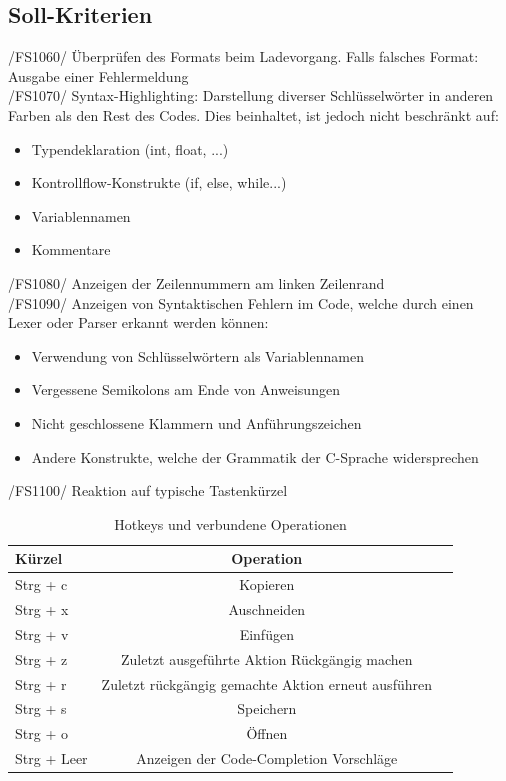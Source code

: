 \documentclass[a4paper]{scrreprt}
\begin{document}
\subsection{Soll-Kriterien}
/FS1060/ Überprüfen des Formats beim Ladevorgang. Falls falsches Format: Ausgabe einer Fehlermeldung \\
/FS1070/ Syntax-Highlighting: Darstellung diverser Schlüsselwörter in anderen Farben als den Rest des Codes. Dies beinhaltet, ist jedoch nicht beschränkt auf: 
\begin{itemize}
\item Typendeklaration (int, float, ...)
\item Kontrollflow-Konstrukte (if, else, while...)
\item Variablennamen
\item Kommentare
\end{itemize}
/FS1080/ Anzeigen der Zeilennummern am linken Zeilenrand \\
/FS1090/ Anzeigen von Syntaktischen Fehlern im Code, welche durch einen Lexer oder Parser erkannt werden können: 
\begin{itemize}
\item Verwendung von Schlüsselwörtern als Variablennamen 
\item Vergessene Semikolons am Ende von Anweisungen
\item Nicht geschlossene Klammern und Anführungszeichen
\item Andere Konstrukte, welche der Grammatik der C-Sprache widersprechen
\end{itemize}

/FS1100/ Reaktion auf typische Tastenkürzel\\
\begin{table}[H]
\caption{Hotkeys und verbundene Operationen}
\begin{tabular}{lcr} 
Kürzel & Operation \\
\hline 
Strg + c & Kopieren \\
Strg + x & Auschneiden \\
Strg + v & Einfügen \\
Strg + z & Zuletzt ausgeführte Aktion Rückgängig machen \\
Strg + r & Zuletzt rückgängig gemachte Aktion erneut ausführen \\
Strg + s & Speichern \\
Strg + o & Öffnen \\
Strg + Leer & Anzeigen der Code-Completion Vorschläge\\
\end{tabular}
\label{table:Hotkeys_and_operations}
\end{table}
\end{document}
